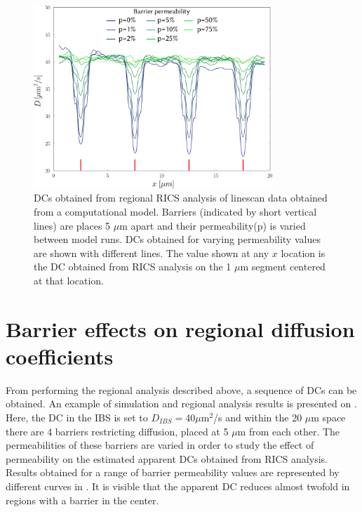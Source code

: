 \begin{figure}[t!]
  \centering
    \includegraphics[width=9cm]{figures/range_5.pdf}
    \caption[Regional \acsp{DC} for barriers 5 $\mu$m apart]{\acsp{DC} obtained from regional \ac{RICS} analysis
    of linescan data obtained from a computational model. Barriers
    (indicated by short vertical lines) are places 5 $\mu$m apart and
    their permeability(p) is varied between model runs. \acsp{DC} obtained
    for varying permeability values are shown with different lines. The
    value shown at any $x$ location is the \ac{DC} obtained from
    \ac{RICS} analysis on the 1 $\mu$m segment centered at that
    location.}
    \label{fig:1drange}
\end{figure}
\section{Barrier effects on regional diffusion coefficients}
From performing the regional analysis described above, a sequence of
\acp{DC} can be obtained. An example of simulation and regional analysis
results is presented on \F{~\ref{fig:1drange}}. Here, the \ac{DC} in the \ac{IBS} is set to
$D_{IBS}=$40$\mu$m$^2$/s and within the 20 $\mu$m space there are 4
barriers restricting diffusion, placed at 5 $\mu$m from each other. The
permeabilities of these barriers are varied in order to study the effect
of permeability on the estimated apparent \acp{DC} obtained from
\ac{RICS} analysis. Results obtained for a range of barrier permeability
values are represented by different curves in \F{~\ref{fig:1drange}}. It
is visible that the apparent \ac{DC} reduces almost twofold in regions
with a barrier in the center.

